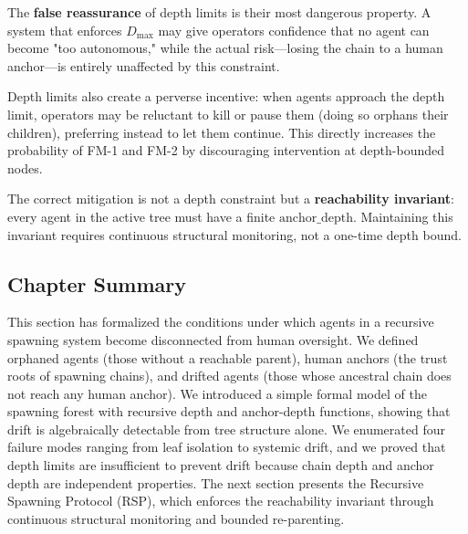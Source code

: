 The \textbf{false reassurance} of depth limits is their most dangerous property. A system that enforces $D_{\max}$ may give operators confidence that no agent can become "too autonomous," while the actual risk—losing the chain to a human anchor—is entirely unaffected by this constraint.

Depth limits also create a perverse incentive: when agents approach the depth limit, operators may be reluctant to kill or pause them (doing so orphans their children), preferring instead to let them continue. This directly increases the probability of FM-1 and FM-2 by discouraging intervention at depth-bounded nodes.

The correct mitigation is not a depth constraint but a \textbf{reachability invariant}: every agent in the active tree must have a finite $\text{anchor\_depth}$. Maintaining this invariant requires continuous structural monitoring, not a one-time depth bound.

\subsection{Chapter Summary}

This section has formalized the conditions under which agents in a recursive spawning system become disconnected from human oversight. We defined orphaned agents (those without a reachable parent), human anchors (the trust roots of spawning chains), and drifted agents (those whose ancestral chain does not reach any human anchor). We introduced a simple formal model of the spawning forest with recursive depth and anchor-depth functions, showing that drift is algebraically detectable from tree structure alone. We enumerated four failure modes ranging from leaf isolation to systemic drift, and we proved that depth limits are insufficient to prevent drift because chain depth and anchor depth are independent properties. The next section presents the Recursive Spawning Protocol (RSP), which enforces the reachability invariant through continuous structural monitoring and bounded re-parenting.
